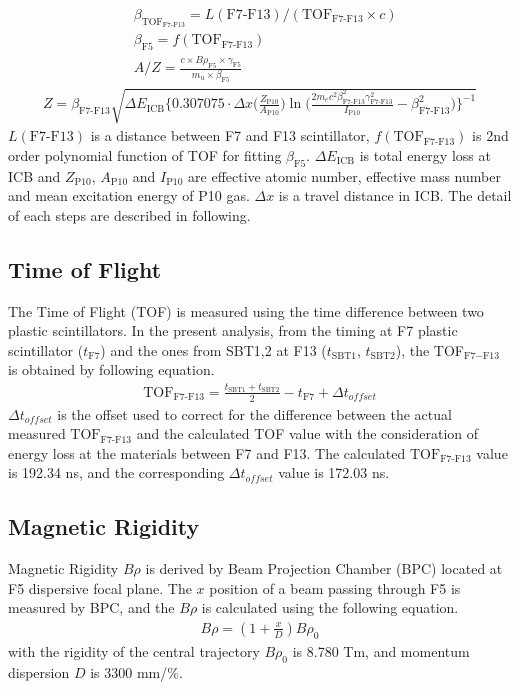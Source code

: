 \begin{align}
    &\beta_{\text{TOF}_{\text{F7-F13}}} = L(\text{F7-F13}) / ( {\text{TOF}}_{\text{F7-F13}} \times c )\\
    &\beta_{\text{F5}} = f(\text{TOF}_{\text{F7-F13}})\\
    &A/Z = \frac{c \times B\rho_{\text{F5}} \times \gamma_{\text{F5}} }{ m_u \times \beta_{\text{F5}}}
\end{align}
\begin{align}
    Z = \beta_{\text{F7-F13}} \sqrt{\Delta E_{\text{ICB}} \bigg\{ 0.307075 \cdot \Delta x \bigg(\frac{Z_{\text{P10}}}{A_{\text{P10}}}\bigg) \ln \bigg( \frac{2m_{e}c^{2}\beta_{\text{F7-F13}}^{2}\gamma_{\text{F7-F13}}^{2}}{I_{\text{P10}}} - \beta_{\text{F7-F13}}^{2}\bigg) \bigg\}^{-1} }
\end{align}
$L(\text{F7-F13})$ is a distance between F7 and F13 scintillator, $f(\text{TOF}_{\text{F7-F13}})$ is 2nd order polynomial function of TOF for fitting $\beta_{\text{F5}}$. $\Delta E_{\text{ICB}}$ is total energy loss at ICB and $Z_{\text{P10}}$, $A_{\text{P10}}$ and $I_{\text{P10}}$ are effective atomic number, effective mass number and mean excitation energy of P10 gas. $\Delta x$ is a travel distance in ICB. The detail of each steps are described in following.

\subsection{Time of Flight}
The Time of Flight (TOF) is measured using the time difference between two plastic scintillators. In the present analysis, from the timing at F7 plastic scintillator ($t_{\text{F7}}$) and the ones from SBT1,2 at F13 ($t_{\text{SBT1}}$, $t_{\text{SBT2}}$), the TOF$_{\text{F7}-\text{F13}}$ is obtained by following equation.
    \begin{align}
        \text{TOF}_{\text{F7-F13}} = \frac{t_{\text{SBT1}} + t_{\text{SBT2}}}{2} - t_{\text{F7}} + \Delta t_{offset}
    \end{align}
$\Delta t_{offset}$ is the offset used to correct for the difference between the actual measured $\text{TOF}_{\text{F7-F13}}$ and the calculated TOF value with the consideration of energy loss at the materials between F7 and F13. The calculated $\text{TOF}_{\text{F7-F13}}$ value is 192.34 ns, and the corresponding $\Delta t_{offset}$ value is 172.03 ns.

\subsection{Magnetic Rigidity}
Magnetic Rigidity $B\rho$ is derived by Beam Projection Chamber (BPC) located at F5 dispersive focal plane. The $x$ position of a beam passing through F5 is measured by BPC, and the $B\rho$ is calculated using the following equation.
    \begin{align}
        B\rho = (1+\frac{x}{D}) B\rho_{0} 
    \end{align}
with the rigidity of the central trajectory $B\rho_{0}$ is 8.780 Tm, and  momentum dispersion $D$ is 3300 mm/$\%$. 

